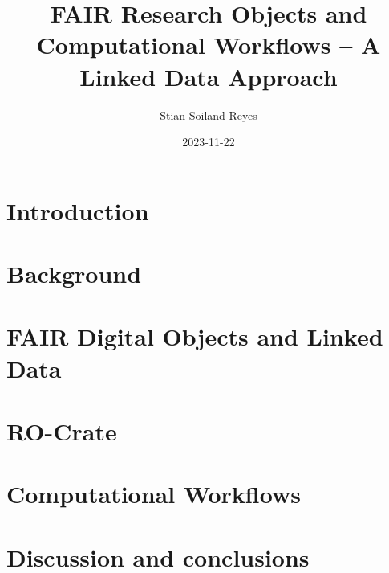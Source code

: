 \documentclass[british,a4paper]{book}
\title{FAIR Research Objects and Computational Workflows – A Linked Data Approach}
\author{Stian Soiland-Reyes}
\date{2023-11-22}
\begin{document}
\frontmatter
\maketitle



\tableofcontents
{}

\listoffigures
{}

\listoftables
{}

\listoflistings
{}


\mainmatter
\fancyhead[LO]{\leftmark}


\chapter{Introduction}
\label{chapter:introduction}


\chapter{Background}
\label{chapter:background}


\chapter{FAIR Digital Objects and Linked Data}
\label{chapter:fdo}



\chapter{RO-Crate}
\label{chapter:ro-crate}





\chapter{Computational Workflows}
\label{chapter:workflows}







\chapter{Discussion and conclusions}
\label{chapter:conclusions}


\end{document}
